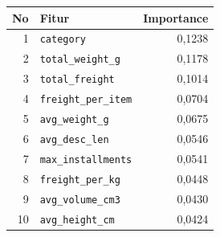 \begin{tabular}{rlr}
\toprule
No & Fitur & Importance \\
\midrule
1 & \texttt{category} & 0,1238 \\
2 & \texttt{total\_weight\_g} & 0,1178 \\
3 & \texttt{total\_freight} & 0,1014 \\
4 & \texttt{freight\_per\_item} & 0,0704 \\
5 & \texttt{avg\_weight\_g} & 0,0675 \\
6 & \texttt{avg\_desc\_len} & 0,0546 \\
7 & \texttt{max\_installments} & 0,0541 \\
8 & \texttt{freight\_per\_kg} & 0,0448 \\
9 & \texttt{avg\_volume\_cm3} & 0,0430 \\
10 & \texttt{avg\_height\_cm} & 0,0424 \\
\bottomrule
\end{tabular}

